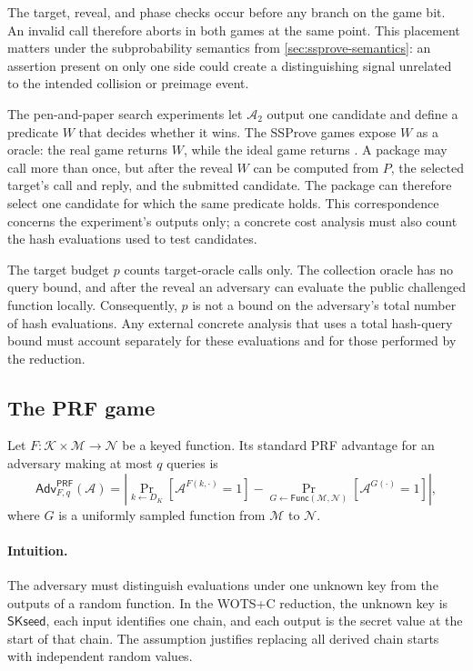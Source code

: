 \documentclass[11pt,a4paper]{article}
\theoremstyle{plain}
\theoremstyle{definition}
\DeclareRobustCommand{\coq}[1]{\texttt{\detokenize{#1}}}
\newcommand{\SSProve}{\textsf{SSProve}\xspace}
\newcommand{\WOTSC}{\textsf{WOTS+C}\xspace}
\newcommand{\Adv}{\mathsf{Adv}}
\newcommand{\A}{\mathcal{A}}
\newcommand{\SKseed}{\ensuremath{\mathsf{SKseed}}\xspace}
\begin{document}
The target, reveal, and phase checks occur before any branch on the game bit.
An invalid call therefore aborts in both games at the same point.
This placement matters under the subprobability semantics from \cref{sec:ssprove-semantics}: an assertion present on only one side could create a distinguishing signal unrelated to the intended collision or preimage event.

The pen-and-paper search experiments let \(\A_2\) output one candidate and define a predicate \(W\) that decides whether it wins.
The \SSProve games expose \(W\) as a \coq{CHECK} oracle: the real game returns \(W\), while the ideal game returns \coq{false}.
A package may call \coq{CHECK} more than once, but after the reveal \(W\) can be computed from \(P\), the selected target's call and reply, and the submitted candidate.
The package can therefore select one candidate for which the same predicate holds.
This correspondence concerns the experiment's outputs only; a concrete cost analysis must also count the hash evaluations used to test candidates.

The target budget \(p\) counts target-oracle calls only.
The collection oracle has no query bound, and after the reveal an adversary can evaluate the public challenged function locally.
Consequently, \(p\) is not a bound on the adversary's total number of hash evaluations.
Any external concrete analysis that uses a total hash-query bound must account separately for these evaluations and for those performed by the reduction.

\subsection{The PRF game}

Let \(F:\mathcal K\times\mathcal M\to\mathcal N\) be a keyed function.
Its standard PRF advantage for an adversary making at most \(q\) queries is
\begin{equation}
\label{eq:prf-definition}
  \Adv^{\mathsf{PRF}}_{F,q}(\A)
  =
  \left|
    \Pr_{k\leftarrow D_K}\!\left[\A^{F(k,\cdot)}=1\right]
    -
    \Pr_{G\leftarrow\mathsf{Func}(\mathcal M,\mathcal N)}\!\left[\A^{G(\cdot)}=1\right]
  \right|,
\end{equation}
where \(G\) is a uniformly sampled function from \(\mathcal M\) to \(\mathcal N\).

\paragraph{Intuition.}
The adversary must distinguish evaluations under one unknown key from the outputs of a random function.
In the \WOTSC reduction, the unknown key is \(\SKseed\), each input identifies one chain, and each output is the secret value at the start of that chain.
The assumption justifies replacing all derived chain starts with independent random values.
\end{document}

